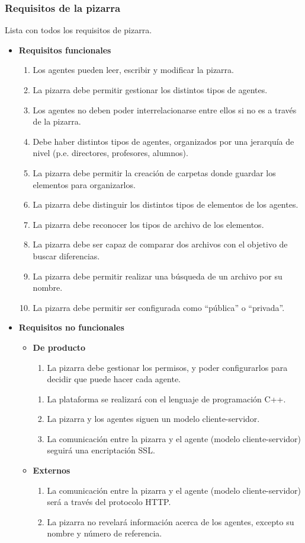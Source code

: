 \subsubsection{Requisitos de la pizarra}
Lista con todos los requisitos de pizarra.
\begin{itemize}
\item \textbf{Requisitos funcionales}
	\begin{enumerate}
		\item Los agentes pueden leer, escribir y modificar la pizarra.
		\item La pizarra debe permitir gestionar los distintos tipos de agentes.
		\item Los agentes no deben poder interrelacionarse entre ellos si no es a través de la pizarra.
		\item Debe haber distintos tipos de agentes, organizados por una jerarquía de nivel (p.e. directores, profesores, alumnos).
		\item La pizarra debe permitir la creación de carpetas donde guardar los elementos para organizarlos.
		\item La pizarra debe distinguir los distintos tipos de elementos de los agentes.
		\item La pizarra debe reconocer los tipos de archivo de los elementos.
		\item La pizarra debe ser capaz de comparar dos archivos con el objetivo de buscar diferencias.
		\item La pizarra debe permitir realizar una búsqueda de un archivo por su nombre.
		\item La pizarra debe permitir ser configurada como ``pública'' o ``privada''.
	\end{enumerate}
\item \textbf{Requisitos no funcionales}
		\begin{itemize}
			\item \textbf{De producto}
	\begin{enumerate}
		\item La pizarra debe gestionar los permisos, y poder configurarlos para decidir que puede hacer cada agente.
	\end{enumerate}
	\begin{enumerate}
		\item La plataforma se realizará con el lenguaje de programación C++.
		\item La pizarra y los agentes siguen un modelo cliente-servidor.
		\item La comunicación entre la pizarra y el agente (modelo cliente-servidor) seguirá una encriptación SSL.
	\end{enumerate}
			\item \textbf{Externos}
	\begin{enumerate}
		\item La comunicación entre la pizarra y el agente (modelo cliente-servidor) será a través del protocolo HTTP.
		\item La pizarra no revelará información acerca de los agentes, excepto su nombre y número de referencia.
	\end{enumerate}
		\end{itemize}
\end{itemize}

